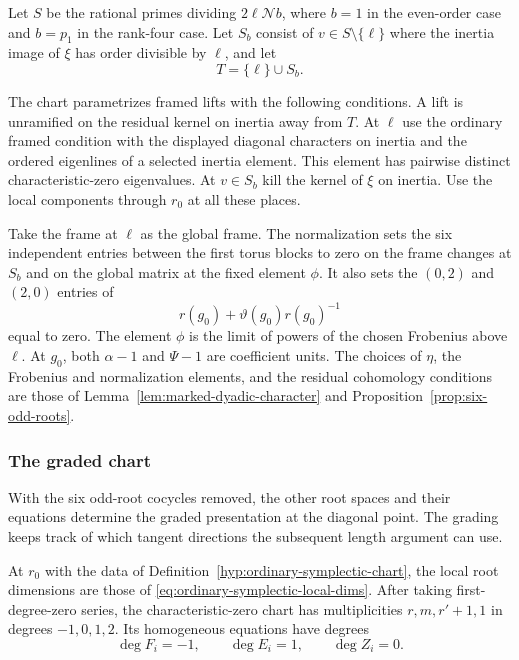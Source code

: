 \begin{paramdefinition}\label{hyp:ordinary-symplectic-chart}
Let \(S\) be the rational primes dividing \(2\ell\mathcal N b\),
where \(b=1\) in the even-order case and \(b=p_1\) in the rank-four case.
Let \(S_b\) consist of \(v\in S\setminus\{\ell\}\)
where the inertia image of \(\xi\) has order divisible by
\(\ell\), and let
\[
 T=\{\ell\}\cup S_b.
\]

The chart parametrizes framed lifts with the following conditions. A lift is unramified on the residual kernel on
inertia away from \(T\). At \(\ell\) use the ordinary framed
condition with the displayed diagonal characters on inertia
and the ordered eigenlines of a selected inertia element.
This element has pairwise distinct characteristic-zero eigenvalues.
At \(v\in S_b\) kill the kernel of \(\xi\) on inertia.
Use the local components through \(r_0\) at all these places.

Take the frame at \(\ell\) as the global frame. The normalization
sets the six independent entries between the first torus blocks
to zero on the frame changes at \(S_b\) and on the global
matrix at the fixed element \(\phi\). It also sets the
\((0,2)\) and \((2,0)\) entries of
\[
                   r(g_0)+\vartheta(g_0)r(g_0)^{-1}
\]
equal to zero. The element \(\phi\) is the limit of powers of the
chosen Frobenius above \(\ell\). At \(g_0\), both
\(\alpha-1\) and \(\Psi-1\) are coefficient units. The choices
of \(\eta\), the Frobenius and normalization elements, and the
residual cohomology conditions are those of
Lemma~\ref{lem:marked-dyadic-character} and
Proposition~\ref{prop:six-odd-roots}.
\end{paramdefinition}
\label{cor:ordinary-symplectic-cohomology-1}



\subsubsection{The graded chart}

With the six odd-root cocycles removed, the other root spaces and their equations determine the graded presentation at the diagonal point. The grading keeps track of which tangent directions the subsequent length argument can use.

\begin{proposition}\label{prop:marked-graded-presentation}
At \(r_0\) with the data of Definition~\ref{hyp:ordinary-symplectic-chart},
the local root dimensions are those of
\eqref{eq:ordinary-symplectic-local-dims}. After taking first-degree-zero series, the
characteristic-zero chart has multiplicities \(r,m,r'+1,1\)
in degrees \(-1,0,1,2\). Its homogeneous equations have degrees 
\[
 \deg F_i=-1,\qquad \deg E_i=1,\qquad \deg Z_i=0.
\]

\end{proposition}

